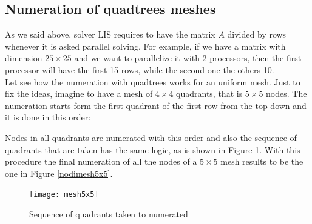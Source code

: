 \subsection{Numeration of quadtrees meshes}
As we said above, solver LIS requires to have the matrix $ A $ divided by rows whenever it is asked parallel solving. For example, if we have a matrix with dimension $ 25 \times 25 $ and we want to parallelize it with 2 processors, then the first processor will have the first 15 rows, while the second one the others 10. \\
Let see how the numeration with quadtrees works for an uniform mesh. Just to fix the ideas, imagine to have a mesh of $ 4 \times 4 $ quadrants, that is $ 5 \times 5 $ nodes. The numeration starts form the first quadrant of the first row from the top down and it is done in this order: \\
\begin{center}
\end{center}
Nodes in all quadrants are numerated with this order and also the sequence of quadrants that are taken has the same logic, as is shown in Figure \ref{mesh5x5}. With this procedure the final numeration of all the nodes of a $ 5 \times 5 $  mesh results to be the one in Figure \ref{nodimesh5x5}.
\begin{figure}[h]
	\centering
	\texttt{[image: mesh5x5]}
	\caption[Sequence of quadrants taken in quadtrees numetation for a mesh $ 5\times 5 $]{Sequence of quadrants taken to numerated}
	\label{mesh5x5}
\end{figure}

